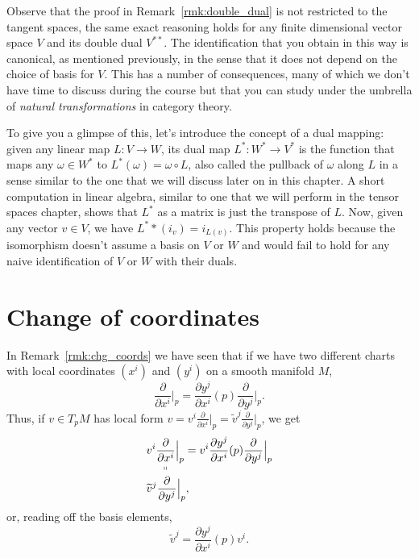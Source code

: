 \begin{remark}
  Observe that the proof in Remark~\ref{rmk:double_dual} is not restricted to the tangent spaces, the same exact reasoning holds for any finite dimensional vector space $V$ and its double dual $V^{**}$.
  The identification that you obtain in this way is canonical, as mentioned previously, in the sense that it does not depend on the choice of basis for $V$. This has a number of consequences, many of which we don't have time to discuss during the course but that you can study under the umbrella of \emph{natural transformations} in category theory.

  To give you a glimpse of this, let's introduce the concept of a dual mapping: given any linear map $L:V\to W$, its dual map $L^* : W^* \to V^*$ is the function that maps any $\omega\in W^*$ to $L^*(\omega) = \omega \circ L$, also called the pullback of $\omega$ along $L$ in a sense similar to the one that we will discuss later on in this chapter. A short computation in linear algebra, similar to one that we will perform in the tensor spaces chapter, shows that $L^*$ as a matrix is just the transpose of $L$. Now, given any vector $v\in V$, we have $L^**(i_v)=i_{L(v)}$. This property holds because the isomorphism doesn't assume a basis on $V$ or $W$ and would fail to hold for any naive identification of $V$ or $W$ with their duals.
\end{remark}

\section{Change of coordinates}
In Remark~\ref{rmk:chg_coords} we have seen that if we have two different charts with local coordinates $(x^i)$ and $(y^i)$ on a smooth manifold $M$,
\begin{equation}
  \frac{\partial}{\partial x^i}\Big|_p = \frac{\partial y^j}{\partial x^i}(p) \frac{\partial}{\partial y^j}\Big|_p.
\end{equation}
Thus, if $v\in T_pM$ has local form $v = v^i \frac{\partial}{\partial x^i}\big|_p = \widetilde v^j \frac{\partial}{\partial y^j}\big|_p$, we get
\begin{align}
   & \underset{\shortparallel}{v^i \frac{\partial}{\partial x^i}\Big|_p} = v^i \frac{\partial y^j}{\partial x^i}(p) \frac{\partial}{\partial y^j}\Big|_p \\
   & \widetilde v^j \frac{\partial}{\partial y^j}\Big|_p,
\end{align}
or, reading off the basis elements,
\begin{equation}\label{eq:contravariant}
  \widetilde v^j = \frac{\partial y^j}{\partial x^i}(p) v^i.
\end{equation}

